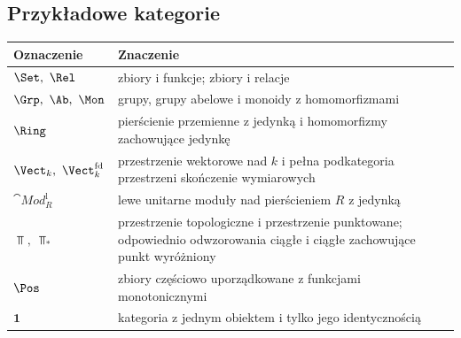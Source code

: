 \subsection{Przykładowe kategorie}
\begin{center}
\renewcommand{\arraystretch}{1.15}
\begin{tabular}{@{}p{.34\linewidth}p{.60\linewidth}@{}}
\textbf{Oznaczenie} & \textbf{Znaczenie} \\
\hline
$\Set,\ \Rel$ & zbiory i funkcje; zbiory i relacje \\
$\Grp,\ \Ab,\ \Mon$ & grupy, grupy abelowe i monoidy z homomorfizmami \\
$\Ring$ & pierścienie przemienne z jedynką i homomorfizmy zachowujące jedynkę \\
$\Vect_k,\ \Vect_k^{\mathrm{fd}}$ & przestrzenie wektorowe nad $k$ i pełna podkategoria przestrzeni skończenie wymiarowych \\
$\cat{Mod}_R^{\mathrm{l}}$ & lewe unitarne moduły nad pierścieniem $R$ z jedynką \\
$\Top,\ \Top_*$ & przestrzenie topologiczne i przestrzenie punktowane; odpowiednio odwzorowania ciągłe i ciągłe zachowujące punkt wyróżniony \\
$\Pos$ & zbiory częściowo uporządkowane z funkcjami monotonicznymi \\
$\mathbf 1$ & kategoria z jednym obiektem i tylko jego identycznością \\
\end{tabular}
\end{center}

